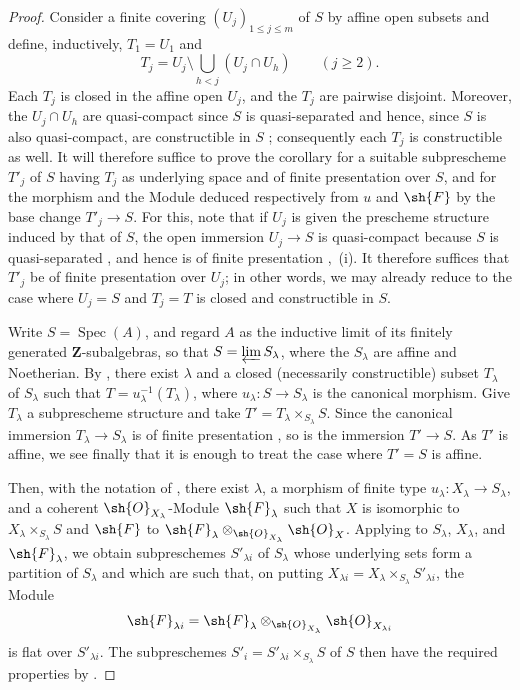 \begin{proof}
Consider a finite covering $(U_j)_{1\leqslant j\leqslant m}$ of $S$ by affine open subsets and define, inductively, $T_1=U_1$ and
\[
T_j=U_j\setminus\bigcup_{h<j}(U_j\cap U_h)\qquad(j\geqslant 2).
\]
Each $T_j$ is closed in the affine open $U_j$, and the $T_j$ are pairwise disjoint.
Moreover, the $U_j\cap U_h$ are quasi-compact since $S$ is quasi-separated and hence, since $S$ is also quasi-compact, are constructible in $S$ ; consequently each $T_j$ is constructible as well.
It will therefore suffice to prove the corollary for a suitable subprescheme $T'_j$ of $S$ having $T_j$ as underlying space and of finite presentation over $S$, and for the morphism and the Module deduced
respectively from $u$ and $\sh{F}$ by the base change $T'_j\to S$.
For this, note that if $U_j$ is given the prescheme structure induced by that of $S$, the open immersion $U_j\to S$ is quasi-compact because $S$ is quasi-separated , and hence is of finite presentation ,~(i).
It therefore suffices that $T'_j$ be of finite presentation over $U_j$; in other words, we may already reduce to the case where $U_j=S$ and $T_j=T$ is closed and constructible in $S$.

Write $S=\operatorname{Spec}(A)$, and regard $A$ as the inductive limit of its finitely generated $\mathbf{Z}$-subalgebras, so that $S=\varprojlim S_\lambda$, where the $S_\lambda$ are affine and Noetherian.
By , there exist $\lambda$ and a closed (necessarily constructible) subset $T_\lambda$ of $S_\lambda$ such that $T=u_\lambda^{-1}(T_\lambda)$, where $u_\lambda:S\to S_\lambda$ is the canonical morphism.
Give $T_\lambda$ a subprescheme structure and take $T'=T_\lambda\times_{S_\lambda}S$.
Since the canonical immersion $T_\lambda\to S_\lambda$ is of finite presentation , so is the immersion $T'\to S$.
As $T'$ is affine, we see finally that it is enough to treat the case where $T'=S$ is affine.

Then, with the notation of , there exist $\lambda$, a morphism of finite type $u_\lambda:X_\lambda\to S_\lambda$, and a coherent $\sh{O}_{X_\lambda}$-Module $\sh{F}_\lambda$ such that $X$ is isomorphic to $X_\lambda\times_{S_\lambda}S$ and $\sh{F}$ to $\sh{F}_\lambda\otimes_{\sh{O}_{X_\lambda}}\sh{O}_X$.
Applying  to $S_\lambda$, $X_\lambda$, and $\sh{F}_\lambda$, we obtain subpreschemes $S'_{\lambda i}$ of $S_\lambda$ whose underlying sets form a partition of $S_\lambda$ and which are such that, on putting $X_{\lambda i}=X_\lambda\times_{S_\lambda}S'_{\lambda i}$, the Module
\[
\sh{F}_{\lambda i}=\sh{F}_\lambda\otimes_{\sh{O}_{X_\lambda}}\sh{O}_{X_{\lambda i}}
\]
is flat over $S'_{\lambda i}$.
The subpreschemes $S'_i=S'_{\lambda i}\times_{S_\lambda}S$ of $S$ then have the required properties by .
\end{proof}

